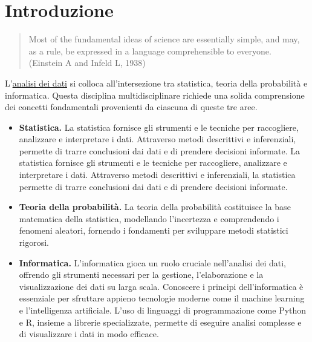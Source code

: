 \documentclass[
  letterpaper,
  krantz2]{{[}./krantz{]}}
\begin{document}
\section*{Introduzione}\label{introduzione-4}


\begin{quote}
Most of the fundamental ideas of science are essentially simple, and
may, as a rule, be expressed in a language comprehensible to everyone.\\
(Einstein A and Infeld L, 1938)
\end{quote}

L'\href{https://imstat.org/2014/09/04/data-science-how-is-it-different-to-statistics\%E2\%80\%89/}{analisi
dei dati} si colloca all'intersezione tra statistica, teoria della
probabilità e informatica. Questa disciplina multidisciplinare richiede
una solida comprensione dei concetti fondamentali provenienti da
ciascuna di queste tre aree.

\begin{itemize}
\item
  \textbf{Statistica.} La statistica fornisce gli strumenti e le
  tecniche per raccogliere, analizzare e interpretare i dati. Attraverso
  metodi descrittivi e inferenziali, permette di trarre conclusioni dai
  dati e di prendere decisioni informate. La statistica fornisce gli
  strumenti e le tecniche per raccogliere, analizzare e interpretare i
  dati. Attraverso metodi descrittivi e inferenziali, la statistica
  permette di trarre conclusioni dai dati e di prendere decisioni
  informate.
\item
  \textbf{Teoria della probabilità.} La teoria della probabilità
  costituisce la base matematica della statistica, modellando
  l'incertezza e comprendendo i fenomeni aleatori, fornendo i fondamenti
  per sviluppare metodi statistici rigorosi.
\item
  \textbf{Informatica.} L'informatica gioca un ruolo cruciale
  nell'analisi dei dati, offrendo gli strumenti necessari per la
  gestione, l'elaborazione e la visualizzazione dei dati su larga scala.
  Conoscere i principi dell'informatica è essenziale per sfruttare
  appieno tecnologie moderne come il machine learning e l'intelligenza
  artificiale. L'uso di linguaggi di programmazione come Python e R,
  insieme a librerie specializzate, permette di eseguire analisi
  complesse e di visualizzare i dati in modo efficace.
\end{itemize}
\end{document}
